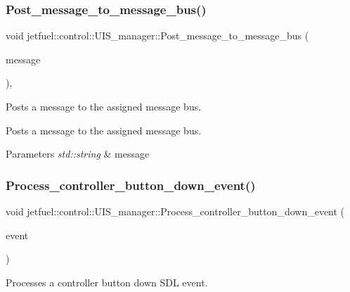 \subsubsection{\texorpdfstring{Post\+\_\+message\+\_\+to\+\_\+message\+\_\+bus()}{Post\_message\_to\_message\_bus()}}
{\footnotesize\ttfamily void jetfuel\+::control\+::\+U\+I\+S\+\_\+manager\+::\+Post\+\_\+message\+\_\+to\+\_\+message\+\_\+bus (\begin{DoxyParamCaption}\item[{const std\+::string}]{message }\end{DoxyParamCaption})\hspace{0.3cm}{\ttfamily [inline]}, {\ttfamily [protected]}}



Posts a message to the assigned message bus. 

Posts a message to the assigned message bus.


\begin{DoxyParams}{Parameters}
{\em std\+::string} & message \\
\hline
\end{DoxyParams}
\mbox{\label{classjetfuel_1_1control_1_1UIS__manager_ab20315b3fd2a89c8f21058385a4ce672}} 
\subsubsection{\texorpdfstring{Process\+\_\+controller\+\_\+button\+\_\+down\+\_\+event()}{Process\_controller\_button\_down\_event()}}
{\footnotesize\ttfamily void jetfuel\+::control\+::\+U\+I\+S\+\_\+manager\+::\+Process\+\_\+controller\+\_\+button\+\_\+down\+\_\+event (\begin{DoxyParamCaption}\item[{S\+D\+L\+\_\+\+Event $\ast$}]{event }\end{DoxyParamCaption})\hspace{0.3cm}{\ttfamily [protected]}}



Processes a controller button down S\+DL event. 

